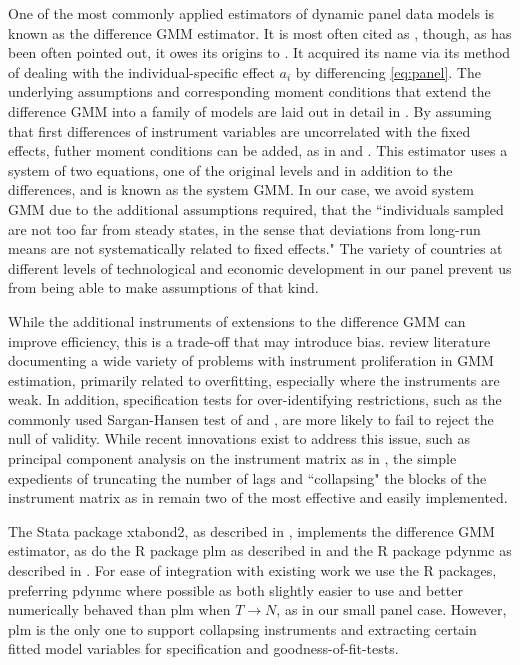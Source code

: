 \documentclass[12pt,a4paper]{article}
\newcommand{\pkg}[1]{{\fontseries{b}\selectfont #1}}
\begin{document}
One of the most commonly applied estimators of dynamic panel data models is known as the difference GMM estimator.
It is most often cited as \cite{arellanoTestsSpecificationPanel1991}, though, as has been often pointed out, it owes its origins to \cite{holtz-eakinEstimatingVectorAutoregressions1988}.
It acquired its name via its method of dealing with the individual-specific effect $a_i$ by differencing \cref{eq:panel}.
The underlying assumptions and corresponding moment conditions that extend the difference GMM into a family of models are laid out in detail in \cite{fritschGMMEstimationLinear2019}.
By assuming that first differences of instrument variables are uncorrelated with the fixed effects, futher moment conditions can be added, as in \cite{arellanoAnotherLookInstrumental1995} and \cite{blundellInitialConditionsMoment1998}.
This estimator uses a system of two equations, one of the original levels and in addition to the differences, and is known as the system GMM.
In our case, we avoid system GMM due to the additional assumptions required, that the ``individuals sampled are not too far from steady states, in the sense that deviations from long-run means are not
systematically related to fixed effects." \cite[p.128]{roodmanHowXtabond2Introduction2009}
The variety of countries at different levels of technological and economic development in our panel prevent us from being able to make assumptions of that kind.

While the additional instruments of extensions to the difference GMM can improve efficiency, this is a trade-off that may introduce bias.
\cite{bontempiImplementingStrategyReduce2015} review literature documenting a wide variety of problems with instrument proliferation in GMM estimation, primarily related to overfitting, especially where the instruments are weak.
In addition, specification tests for over-identifying restrictions, such as the commonly used Sargan-Hansen test of \cite{sarganEstimationEconomicRelationships1958} and \cite{hansenLargeSampleProperties1982}, are more likely to fail to reject the null of validity.
While recent innovations exist to address this issue, such as principal component analysis on the instrument matrix as in \cite{bontempiImplementingStrategyReduce2015}, the simple expedients of truncating the number of lags and ``collapsing" the blocks of the instrument matrix as in \cite{roodmanNoteThemeToo2009} remain two of the most effective and easily implemented.

The Stata package \pkg{xtabond2}, as described in \cite{roodmanHowXtabond2Introduction2009}, implements the difference GMM estimator, as do the R package \pkg{plm} as described in \cite{croissantPanelDataEconometrics2008} and the R package \pkg{pdynmc} as described in \cite{fritschPdynmcPackageEstimating2019}.
For ease of integration with existing work we use the R packages, preferring \pkg{pdynmc} where possible as both slightly easier to use and better numerically behaved than \pkg{plm} when $T \rightarrow N$, as in our small panel case.
However, \pkg{plm} is the only one to support collapsing instruments and extracting certain fitted model variables for specification and goodness-of-fit-tests.
\end{document}

